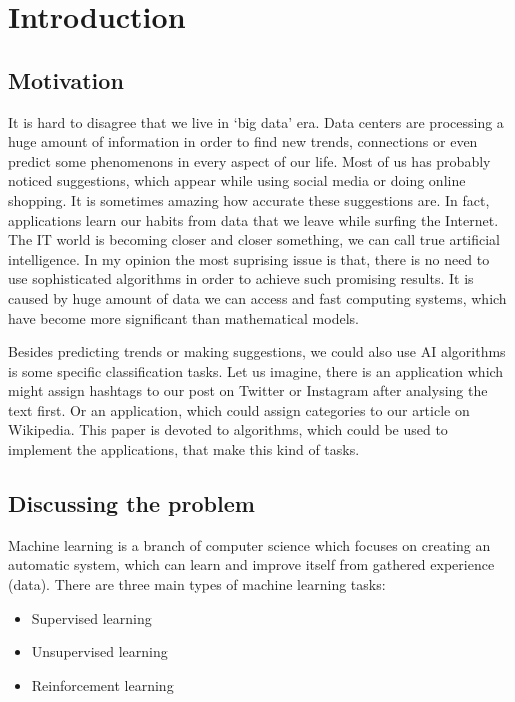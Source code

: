 
\chapter{Introduction}

\section{Motivation}

It is hard to disagree that we live in `big data' era. Data centers are processing a huge amount of information in order to find new trends, connections or even predict some phenomenons in every aspect of our life. Most of us has probably noticed suggestions, which appear while using social media or doing online shopping. It is sometimes amazing how accurate these suggestions are. In fact, applications learn our habits from data that we leave while surfing the Internet. The IT world is becoming closer and closer something, we can call true artificial intelligence. In my opinion the most suprising issue is that, there is no need to use sophisticated algorithms in order to achieve such promising results. It is caused by huge amount of data we can access and fast computing systems, which have become more significant than mathematical models.  

Besides predicting trends or making suggestions, we could also use AI algorithms is some specific classification tasks. Let us imagine, there is an application which might assign hashtags to our post on Twitter or Instagram after analysing the text first. Or an application, which could assign categories to our article on Wikipedia. This paper is devoted to algorithms, which could be used to implement the applications, that make this kind of tasks. 

\section{Discussing the problem}

Machine learning is a branch of computer science which focuses on creating an automatic system, which can learn and improve itself from gathered experience (data). There are three main types of machine learning tasks:

\begin{itemize}
\item Supervised learning
\item Unsupervised learning
\item Reinforcement learning
\end{itemize}

